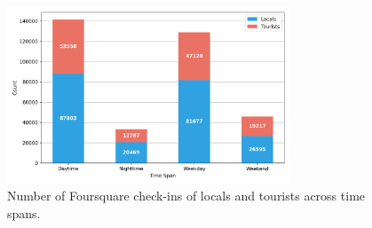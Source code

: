 \documentclass{article}
\begin{document}
\begin{figure}[!h]
\centering
\includegraphics[width=0.75\textwidth]{figures/foursquare_checkins_count.png}
\caption{\label{fig:foursquare_checkins_count}Number of Foursquare check-ins of locals and tourists across time spans.}
\end{figure}
\end{document}
